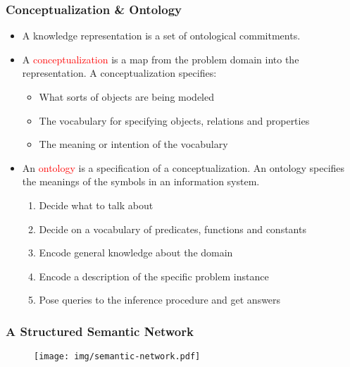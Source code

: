 \documentclass[UTF8,11pt,colorlinks,compress,openany]{beamer}%
\begin{document}
\begin{frame}\frametitle{Conceptualization \& Ontology}
\begin{itemize}
	\item A knowledge representation is a set of ontological commitments.
	\item A \textcolor{red}{conceptualization} is a map from the problem domain into the representation. A conceptualization specifies:
	\begin{itemize}
		\item What sorts of objects are being modeled
		\item The vocabulary for specifying objects, relations and properties
		\item The meaning or intention of the vocabulary
	\end{itemize}
	\item An \textcolor{red}{ontology} is a specification of a conceptualization. An ontology specifies the meanings of the symbols in an information system.
	\begin{enumerate}
		\item Decide what to talk about
		\item Decide on a vocabulary of predicates, functions and constants
		\item Encode general knowledge about the domain
		\item Encode a description of the specific problem instance
		\item Pose queries to the inference procedure and get answers
	\end{enumerate}
\end{itemize}
\end{frame}

\begin{frame}\frametitle{A Structured Semantic Network}
\begin{figure}[H]
\texttt{[image: img/semantic-network.pdf]}	
\end{figure}
\end{frame}
\end{document}

